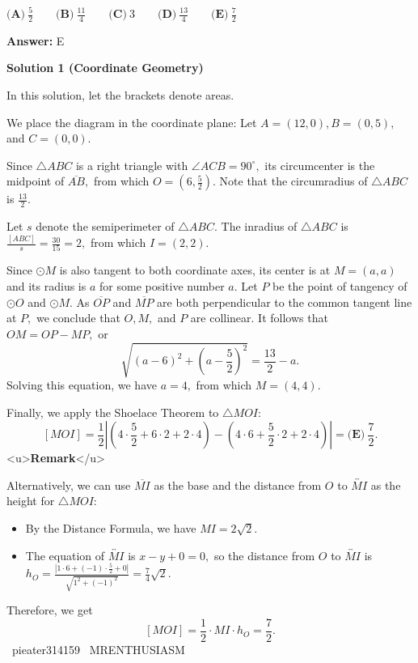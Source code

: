 \begin{enumerate}
 $\textbf{(A)}\ \frac52\qquad\textbf{(B)}\ \frac{11}{4}\qquad\textbf{(C)}\ 3\qquad\textbf{(D)}\ \frac{13}{4}\qquad\textbf{(E)}\ \frac72$

 \textbf{Answer: }E



\textbf{Solution 1 (Coordinate Geometry)}

In this solution, let the brackets denote areas.

 We place the diagram in the coordinate plane: Let $A=(12,0),B=(0,5),$ and $C=(0,0).$

 Since $\triangle ABC$ is a right triangle with $\angle ACB=90^\circ,$ its circumcenter is the midpoint of $\overline{AB},$ from which $O=\left(6,\frac52\right).$ Note that the circumradius of $\triangle ABC$ is $\frac{13}{2}.$ 

 Let $s$ denote the semiperimeter of $\triangle ABC.$ The inradius of $\triangle ABC$ is $\frac{[ABC]}{s}=\frac{30}{15}=2,$ from which $I=(2,2).$

 Since $\odot M$ is also tangent to both coordinate axes, its center is at $M=(a,a)$ and its radius is $a$ for some positive number $a.$ Let $P$ be the point of tangency of $\odot O$ and $\odot M.$ As $\overline{OP}$ and $\overline{MP}$ are both perpendicular to the common tangent line at $P,$ we conclude that $O,M,$ and $P$ are collinear. It follows that $OM=OP-MP,$ or 
 \[\sqrt{(a-6)^2+\left(a-\frac52\right)^2}=\frac{13}{2}-a.\]Solving this equation, we have $a=4,$ from which $M=(4,4).$

 Finally, we apply the Shoelace Theorem to $\triangle MOI:$ 
 \[[MOI]=\frac12\left|\left(4\cdot\frac52+6\cdot2+2\cdot4\right)-\left(4\cdot6+\frac52\cdot2+2\cdot4\right)\right|=\boxed{\textbf{(E)}\ \frac72}.\]<u>\textbf{Remark}</u>

 Alternatively, we can use $\overline{MI}$ as the base and the distance from $O$ to $\overleftrightarrow{MI}$ as the height for $\triangle MOI:$

            \begin{itemize}
        \item By the Distance Formula, we have $MI=2\sqrt2.$
            \end{itemize}
            
            \begin{itemize}
        \item The equation of $\overleftrightarrow{MI}$ is $x-y+0=0,$ so the distance from $O$ to $\overleftrightarrow{MI}$ is $h_O=\frac{\left|1\cdot6+(-1)\cdot\frac52+0\right|}{\sqrt{1^2+(-1)^2}}=\frac74\sqrt2.$
            \end{itemize}
            Therefore, we get 
 \[[MOI]=\frac12\cdot MI\cdot h_O=\frac72.\]~pieater314159 ~MRENTHUSIASM


\end{enumerate}
